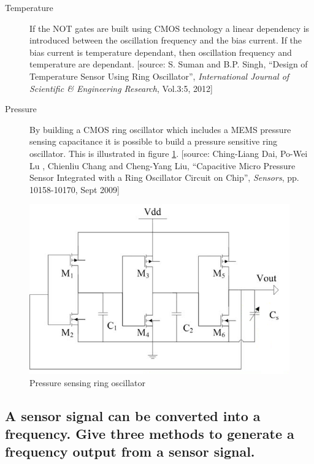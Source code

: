 \documentclass[10pt,a4paper]{article}
\begin{document}
\begin{description}
	\item[Temperature] If the NOT gates are built using CMOS technology a linear dependency is introduced between the oscillation frequency and the bias current. If the bias current is temperature dependant, then oscillation frequency and temperature are dependant. [source: S. Suman and B.P. Singh, ``Design of Temperature Sensor Using Ring Oscillator'', \textit{International Journal of Scientific \& Engineering Research}, Vol.3:5, 2012]
	\item[Pressure] By building a CMOS ring oscillator which includes a MEMS pressure sensing capacitance it is possible to build a pressure sensitive ring oscillator. This is illustrated in figure \ref{fig:ring-cap}. [source: Ching-Liang Dai, Po-Wei Lu , Chienliu Chang and Cheng-Yang Liu, ``Capacitive Micro Pressure Sensor Integrated with a Ring Oscillator Circuit on Chip'', \textit{Sensors}, pp. 10158-10170, Sept 2009]
\end{description}

\begin{figure}[h!]
	\centering
	\includegraphics[width=\textwidth]{ring-cap.png}
	\caption{Pressure sensing ring oscillator}
	\label{fig:ring-cap}
\end{figure}

\subsection{A sensor signal can be converted into a frequency. Give three methods to generate a frequency output from a
sensor signal.}
\end{document}
